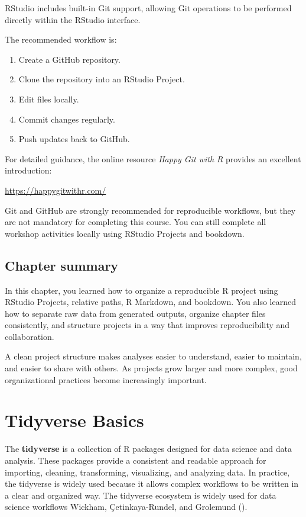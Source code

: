 \documentclass[
  11pt,
  oneside]{book}
\providecommand{\tightlist}{%
  \setlength{\itemsep}{0pt}\setlength{\parskip}{0pt}}
\begin{document}
RStudio includes built-in Git support, allowing Git operations to be performed directly within the RStudio interface.

The recommended workflow is:

\begin{enumerate}
\def\labelenumi{\arabic{enumi}.}
\tightlist
\item
  Create a GitHub repository.
\item
  Clone the repository into an RStudio Project.
\item
  Edit files locally.
\item
  Commit changes regularly.
\item
  Push updates back to GitHub.
\end{enumerate}

For detailed guidance, the online resource \emph{Happy Git with R} provides an excellent introduction:

\url{https://happygitwithr.com/}

Git and GitHub are strongly recommended for reproducible workflows, but they are not mandatory for completing this course. You can still complete all workshop activities locally using RStudio Projects and bookdown.

\section{Chapter summary}\label{chapter-summary}

In this chapter, you learned how to organize a reproducible R project using RStudio Projects, relative paths, R Markdown, and bookdown. You also learned how to separate raw data from generated outputs, organize chapter files consistently, and structure projects in a way that improves reproducibility and collaboration.

A clean project structure makes analyses easier to understand, easier to maintain, and easier to share with others. As projects grow larger and more complex, good organizational practices become increasingly important.

\chapter{Tidyverse Basics}\label{tidyverse-basics}

The \textbf{tidyverse} is a collection of R packages designed for data science and data analysis. These packages provide a consistent and readable approach for importing, cleaning, transforming, visualizing, and analyzing data. In practice, the tidyverse is widely used because it allows complex workflows to be written in a clear and organized way. The tidyverse ecosystem is widely used for data science workflows Wickham, Çetinkaya-Rundel, and Grolemund ().
\end{document}
